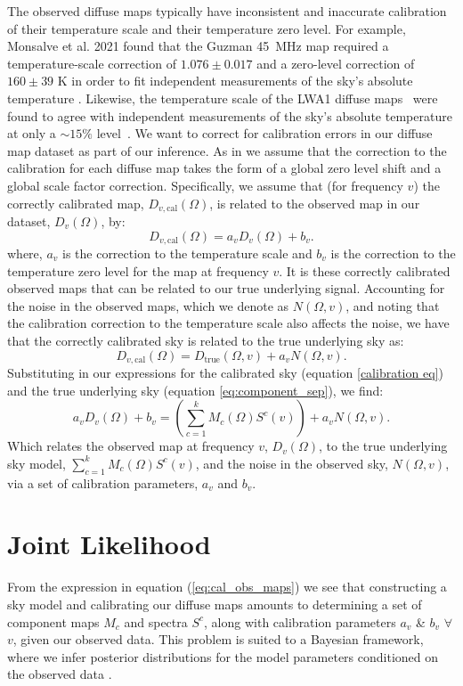 \documentclass[fleqn,usenatbib]{mnras}
\begin{document}
The observed diffuse maps typically have inconsistent and inaccurate calibration of their temperature scale and their temperature zero level. For example, Monsalve et al. 2021 found that the Guzman 45~MHz map \citep{Guzmn2010} required a temperature-scale correction of $1.076 \pm 0.017$ and a zero-level correction of $160 \pm 39$ K in order to fit independent measurements of the sky's absolute temperature \citep{Monsalve2021}. Likewise, the temperature scale of the LWA1 diffuse maps~\citep{LFSM} were found to agree with independent measurements of the sky's absolute temperature at only a $\sim15\%$ level~\citep{Spinelli2021}. We want to correct for calibration errors in our diffuse map dataset as part of our inference. As in \citep{Monsalve2021} we assume that the correction to the calibration for each diffuse map takes the form of a global zero level shift and a global scale factor correction. Specifically, we assume that (for frequency $v$) the correctly calibrated map, $D_{v,\mathrm{cal}}(\Omega)$, is related to the observed map in our dataset, $D_v(\Omega)$, by:
\begin{equation}\label{calibration eq}
    D_{v,\mathrm{cal}}(\Omega) = a_v D_v(\Omega) + b_v.
\end{equation}
where, $a_v$ is the correction to the temperature scale and $b_v$ is the correction to the temperature zero level for the map at frequency $v$. It is these correctly calibrated observed maps that can be related to our true underlying signal. Accounting for the noise in the observed maps, which we denote as \( N(\Omega,v) \), and noting that the calibration correction to the temperature scale also affects the noise, we have that the correctly calibrated sky is related to the true underlying sky as:
\begin{equation}
    D_{v,\mathrm{cal}}(\Omega) = D_\mathrm{true}(\Omega,v) + a_v N(\Omega,v).
\end{equation}
Substituting in our expressions for the calibrated sky (equation \ref{calibration eq}) and the true underlying sky (equation \ref{eq:component_sep}), we find:
\begin{equation}\label{eq:cal_obs_maps}
a_v D_v(\Omega) + b_v = \left(\sum_{c=1}^{k}{M_c(\Omega)S^c(v)}\right)  + a_v N(\Omega,v).
\end{equation}
Which relates the observed map at frequency $v$, $D_v(\Omega)$, to the true underlying sky model, $\sum_{c=1}^{k}{M_c(\Omega)S^c(v)}$, and the noise in the observed sky, $N(\Omega,v)$, via a set of calibration parameters, $a_v$ and $b_v$.
\section{Joint Likelihood}
From the expression in equation (\ref{eq:cal_obs_maps}) we see that constructing a sky model and calibrating our diffuse maps amounts to determining a set of component maps \( M_c \) and spectra \( S^c \), along with calibration parameters $a_v$ \& $b_v$ $\forall$ $v$, given our observed data. This problem is suited to a Bayesian framework, where we infer posterior distributions for the model parameters conditioned on the observed data \citep{Sivia_Skilling}. 
\end{document}
